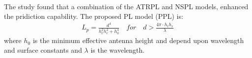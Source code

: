 \large

\begin{minipage}{.45\textwidth}
The study found that a combination of the ATRPL and NSPL models, enhanced the pridiction capability. The proposed PL model (PPL) is:
\vspace{-0.5em}\begin{align*}
L_p = \frac{d^4}{h_t^2 h_r^2+h_0^4}\quad for \quad d > \frac{4\pi\cdot h_th_r}{\lambda}
\end{align*}
where $h_0$ is the minimum effective antenna height and depend upon wavelength and surface constants and $\lambda$ is the wavelength.


\end{minipage}%
\hspace{1cm}
\begin{minipage}{0.45\textwidth}
\begin{center}

\end{center}
\end{minipage}

\vspace{0.5em}
\begin{minipage}{0.5\textwidth}
\begin{center}

\end{center}
\end{minipage}
\begin{minipage}{0.5\textwidth}
\begin{center}

\end{center}
\end{minipage}

